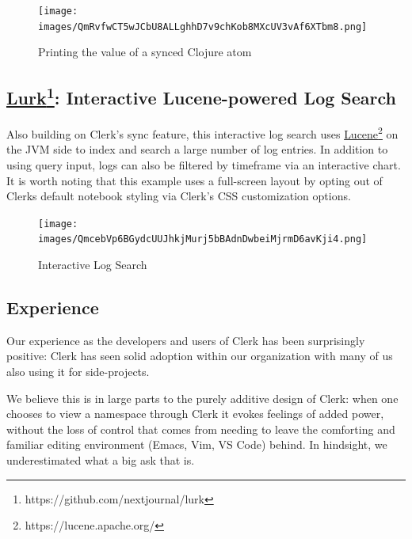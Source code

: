 \documentclass[sigconf,screen]{acmart}
\begin{document}
\begin{figure}
\hypertarget{printing-the-value-of-a-synced-clojure-atom}{%
\centering
\texttt{[image: images/QmRvfwCT5wJCbU8ALLghhD7v9chKob8MXcUV3vAf6XTbm8.png]}
\caption{Printing the value of a synced Clojure atom}\label{printing-the-value-of-a-synced-clojure-atom}
}
\end{figure}

\hypertarget{lurk:-interactive-lucene-powered-log-search}{%
\subsection[: Interactive Lucene-powered Log Search]{\texorpdfstring{{\href{https://github.com/nextjournal/lurk}{Lurk}\footnote{https://github.com/nextjournal/lurk}}: Interactive Lucene-powered Log Search}{Lurk: Interactive Lucene-powered Log Search}}\label{lurk:-interactive-lucene-powered-log-search}}

Also building on Clerk's sync feature, this interactive log search uses {\href{https://lucene.apache.org/}{Lucene}\footnote{https://lucene.apache.org/}} on the JVM side to index and search a large number of log entries. In addition to using query input, logs can also be filtered by timeframe via an interactive chart. It is worth noting that this example uses a full-screen layout by opting out of Clerk\textquotesingle s default notebook styling via Clerk's CSS customization options.

\begin{figure}
\hypertarget{interactive-log-search}{%
\centering
\texttt{[image: images/QmcebVp6BGydcUUJhkjMurj5bBAdnDwbeiMjrmD6avKji4.png]}
\caption{Interactive Log Search}\label{interactive-log-search}
}
\end{figure}

\hypertarget{experience}{%
\subsection{Experience}\label{experience}}

Our experience as the developers and users of Clerk has been surprisingly positive: Clerk has seen solid adoption within our organization with many of us also using it for side-projects.

We believe this is in large parts to the purely additive design of Clerk: when one chooses to view a namespace through Clerk it evokes feelings of added power, without the loss of control that comes from needing to leave the comforting and familiar editing environment (Emacs, Vim, VS Code) behind. In hindsight, we underestimated what a big ask that is.
\end{document}
